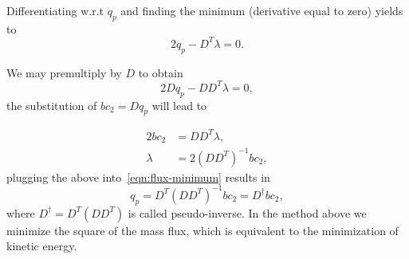 \documentclass{article}
\begin{document}
Differentiating w.r.t $q_p$ and finding the minimum (derivative equal to zero) yields to
\begin{equation}\label{eqn:flux-minimum}
2 q_p-D^T \lambda=0.
\end{equation}

We may premultiply by $D$ to obtain
\begin{equation}
2 D q_p-D D^T \lambda=0,
\end{equation}
the substitution of $bc_2=D q_p$ will lead to

\begin{equation}
\begin{aligned}
2 bc_2&=D D^T \lambda,\\
\lambda &=2\left(D D^T\right)^{-1} bc_2,
\end{aligned}
\end{equation}
plugging the above into~\eqref{eqn:flux-minimum} results in
\begin{equation}
q_p=D^T\left(D D^T\right)^{-1} bc_2=D^\dagger bc_2,
\end{equation}
where $D^\dagger=D^T\left(D D^T\right)$ is called pseudo-inverse. In the method above we minimize the square of the mass flux, which is equivalent to the minimization of kinetic energy. 
 
\end{document}
